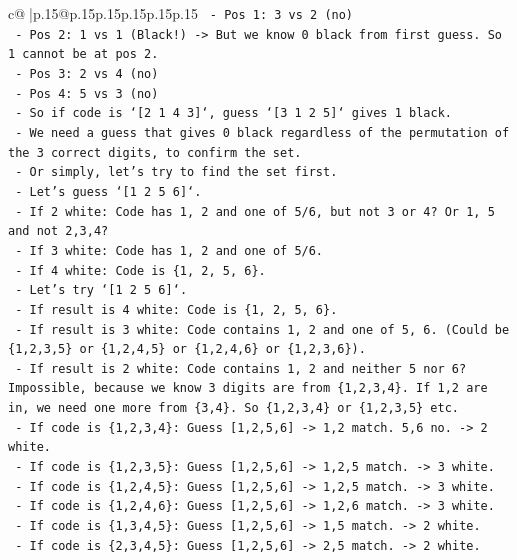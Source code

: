 \documentclass{article}
\begin{document}
{\begin{supertabular}{c@{$\;$}|p{.15\linewidth}@{}p{.15\linewidth}p{.15\linewidth}p{.15\linewidth}p{.15\linewidth}p{.15\linewidth}}
{{{\texttt{    {-} Pos 1: 3 vs 2 (no)} \\
\texttt{    {-} Pos 2: 1 vs 1 (Black!) {-}> But we know 0 black from first guess. So 1 cannot be at pos 2.} \\
\texttt{    {-} Pos 3: 2 vs 4 (no)} \\
\texttt{    {-} Pos 4: 5 vs 3 (no)} \\
\texttt{  {-} So if code is `{[}2 1 4 3{]}`, guess `{[}3 1 2 5{]}` gives 1 black.} \\
\texttt{  {-} We need a guess that gives 0 black regardless of the permutation of the 3 correct digits, to confirm the set.} \\
\texttt{  {-} Or simply, let's try to find the set first.} \\
\texttt{  {-} Let's guess `{[}1 2 5 6{]}`.} \\
\texttt{    {-} If 2 white: Code has 1, 2 and one of 5/6, but not 3 or 4? Or 1, 5 and not 2,3,4?} \\
\texttt{    {-} If 3 white: Code has 1, 2 and one of 5/6.} \\
\texttt{    {-} If 4 white: Code is \{1, 2, 5, 6\}.} \\
\texttt{  {-} Let's try `{[}1 2 5 6{]}`.} \\
\texttt{    {-} If result is 4 white: Code is \{1, 2, 5, 6\}.} \\
\texttt{    {-} If result is 3 white: Code contains 1, 2 and one of 5, 6. (Could be \{1,2,3,5\} or \{1,2,4,5\} or \{1,2,4,6\} or \{1,2,3,6\}).} \\
\texttt{    {-} If result is 2 white: Code contains 1, 2 and neither 5 nor 6? Impossible, because we know 3 digits are from \{1,2,3,4\}. If 1,2 are in, we need one more from \{3,4\}. So \{1,2,3,4\} or \{1,2,3,5\} etc.} \\
\texttt{      {-} If code is \{1,2,3,4\}: Guess {[}1,2,5,6{]} {-}> 1,2 match. 5,6 no. {-}> 2 white.} \\
\texttt{      {-} If code is \{1,2,3,5\}: Guess {[}1,2,5,6{]} {-}> 1,2,5 match. {-}> 3 white.} \\
\texttt{      {-} If code is \{1,2,4,5\}: Guess {[}1,2,5,6{]} {-}> 1,2,5 match. {-}> 3 white.} \\
\texttt{      {-} If code is \{1,2,4,6\}: Guess {[}1,2,5,6{]} {-}> 1,2,6 match. {-}> 3 white.} \\
\texttt{      {-} If code is \{1,3,4,5\}: Guess {[}1,2,5,6{]} {-}> 1,5 match. {-}> 2 white.} \\
\texttt{      {-} If code is \{2,3,4,5\}: Guess {[}1,2,5,6{]} {-}> 2,5 match. {-}> 2 white.} \\
}}}
\end{supertabular}}
\end{document}
